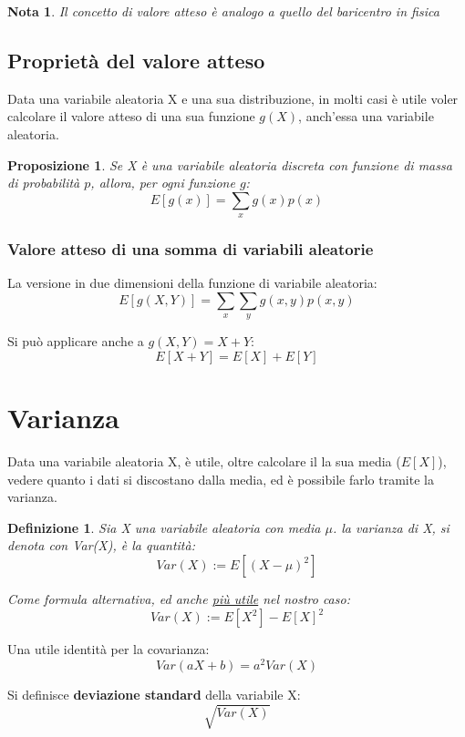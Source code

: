 \documentclass[12pt]{article}
\newtheorem{definition}{Definizione}[section]
\newtheorem{proposition}{Proposizione}[section]
\newtheorem{nota}{Nota}[section]
\begin{document}
\begin{nota}
Il concetto di valore atteso è analogo a quello del baricentro in fisica
\end{nota}

\subsection{Proprietà del valore atteso}
Data una variabile aleatoria X e una sua distribuzione, in molti casi è utile voler calcolare
il valore atteso di una sua funzione \(g(X)\), anch'essa una variabile aleatoria.

\begin{proposition}
    Se X è una variabile aleatoria discreta con funzione di massa di probabilità \(p\), allora,
    per ogni funzione \(g\):
    \[
    E[g(x)] = \sum_{x}g(x)p(x)    
    \]    
\end{proposition}

\subsubsection{Valore atteso di una somma di variabili aleatorie}

La versione in due dimensioni della funzione di variabile aleatoria:
\[
E[g(X,Y)] = \sum_x \sum_y g(x,y) p(x,y)    
\]

Si può applicare anche a \(g(X,Y) =  X+Y\):
\[
E[X+Y] = E[X]+E[Y]    
\]

\newpage
\section{Varianza}

Data una variabile aleatoria X, è utile, oltre calcolare il la sua media (\(E[X]\)), vedere quanto
i dati si discostano dalla media, ed è possibile farlo tramite la varianza. 

\begin{definition}
    Sia X una variabile aleatoria con media \(\mu\). la varianza di X, si denota con Var(X), 
    è la quantità: 
    \[
    Var(X) := E[(X-\mu)^2]    
    \]

    Come formula alternativa, ed anche \underline{più utile} nel nostro caso:
    \[
        Var(X) := E[X^2]- E[X]^2
    \]
\end{definition}

Una utile identità per la covarianza:
\[
Var(aX+b) = a^2Var(X)    
\]

Si definisce \textbf{deviazione standard} della variabile X: 
\[
\sqrt{Var(X)}    
\]
\end{document}
